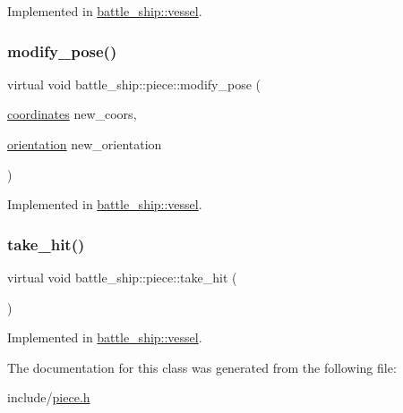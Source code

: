 Implemented in \hyperlink{classbattle__ship_1_1vessel_a36278b899be319a57cb728e8ecd2f340}{battle\+\_\+ship\+::vessel}.

\mbox{\label{classbattle__ship_1_1piece_a052305c855625732d3e5ba96d0fca5f9}} 
\subsubsection{\texorpdfstring{modify\+\_\+pose()}{modify\_pose()}}
{\footnotesize\ttfamily virtual void battle\+\_\+ship\+::piece\+::modify\+\_\+pose (\begin{DoxyParamCaption}\item[{\hyperlink{structbattle__ship_1_1coordinates}{coordinates}}]{new\+\_\+coors,  }\item[{\hyperlink{namespacebattle__ship_aed87488f0a73f0d0679fe343fb61c784}{orientation}}]{new\+\_\+orientation }\end{DoxyParamCaption})\hspace{0.3cm}{\ttfamily [pure virtual]}}



Implemented in \hyperlink{classbattle__ship_1_1vessel_ace0ec527147243b1fa6fa920d5a32a1f}{battle\+\_\+ship\+::vessel}.

\mbox{\label{classbattle__ship_1_1piece_a77642906503e12eb22fcfbc3eab98cb5}} 
\subsubsection{\texorpdfstring{take\+\_\+hit()}{take\_hit()}}
{\footnotesize\ttfamily virtual void battle\+\_\+ship\+::piece\+::take\+\_\+hit (\begin{DoxyParamCaption}{ }\end{DoxyParamCaption})\hspace{0.3cm}{\ttfamily [pure virtual]}}



Implemented in \hyperlink{classbattle__ship_1_1vessel_ab0da3c305902d55594b7aa5d20b69509}{battle\+\_\+ship\+::vessel}.



The documentation for this class was generated from the following file\+:\begin{DoxyCompactItemize}
\item 
include/\hyperlink{piece_8h}{piece.\+h}\end{DoxyCompactItemize}
